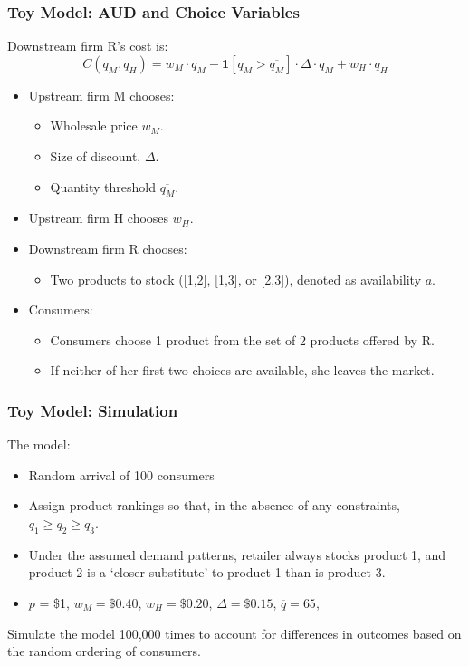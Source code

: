 \begin{frame}
  \frametitle{Toy Model:  AUD and Choice Variables}
\footnotesize
Downstream firm R's cost is:
\begin{equation}
C(q_M,q_H) = w_M \cdot q_M - \symbf{1}[q_M > \overline{q_M}] \cdot  \Delta \cdot q_M + w_H \cdot q_H
\end{equation}

\begin{itemize}\footnotesize
\item Upstream firm M chooses:
	\begin{itemize}\scriptsize
	\item Wholesale price $w_M$.
	\item Size of discount, $\Delta$.
	\item Quantity threshold $\overline{q_M}$.
	\end{itemize}
\item Upstream firm H chooses $w_H$.
\item Downstream firm R chooses:
	\begin{itemize}\scriptsize
	\item Two products to stock ([1,2], [1,3], or [2,3]), denoted as availability $a$.
	\end{itemize}
\item Consumers:
	\begin{itemize}\scriptsize
	\item Consumers choose 1 product from the set of 2 products offered by R.
	\item If neither of her first two choices are available, she leaves the market.
	\end{itemize}
\end{itemize}
\end{frame}


\begin{frame}
  \frametitle{Toy Model:  Simulation}
\footnotesize
The model:
\begin{itemize}
\item Random arrival of 100 consumers
\item Assign product rankings so that, in the absence of any constraints, $q_1 \geq q_2 \geq q_3$.
\item Under the assumed demand patterns, retailer always stocks product 1, and product 2 is a `closer substitute' to product 1 than is product 3.
\item $p$ = \$1, $w_M = \$0.40$, $w_H = \$0.20$, $\Delta = \$0.15$, $\overline{q} = 65$, 
\end{itemize}
Simulate the model 100,000 times to account for differences in outcomes based on the random ordering of consumers.\\

\end{frame}



